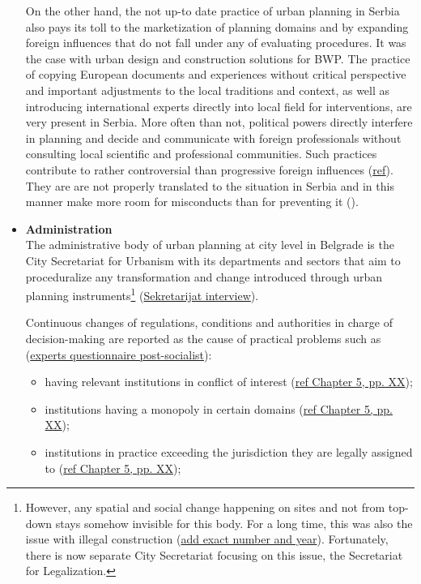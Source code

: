 \documentclass[11pt]{report}
\begin{document}
\begin{itemize}
On the other hand, the not up-to date practice of urban planning in Serbia also pays its toll to the marketization of planning domains and by expanding foreign influences that do not fall under any of evaluating procedures.
It was the case with urban design and construction solutions for BWP.
The practice of copying European documents and experiences without critical perspective and important adjustments to the local traditions and context, as well as introducing international experts directly into local field for interventions, are very present in Serbia.
More often than not, political powers directly interfere in planning and decide and communicate with foreign professionals without consulting local scientific and professional communities.
Such practices contribute to rather controversial than progressive foreign influences (\href{}{ref}). They are are not properly translated to the situation in Serbia and in this manner make more room for misconducts than for preventing it (\cite{Vujosevic 2012}).
\\

\item \textbf{Administration}
\\
The administrative body of urban planning at city level in Belgrade is the City Secretariat for Urbanism with its departments and sectors that aim to proceduralize any transformation and change introduced through urban planning instruments\footnote{However, any spatial and social change happening on sites and not from top-down stays somehow invisible for this body. For a long time, this was also the issue with illegal construction (\href{}{add exact number and year}). Fortunately, there is now separate City Secretariat focusing on this issue, the Secretariat for Legalization.}
(\href{}{Sekretarijat interview}).

Continuous changes of regulations, conditions and authorities in charge of decision-making are reported as the cause of practical problems such as (\href{}{experts questionnaire post-socialist}):

\begin{itemize}
\item having relevant institutions in conflict of interest (\href{}{ref Chapter 5, pp. XX}); 
\item institutions having a monopoly in certain domains (\href{}{ref Chapter 5, pp. XX});
\item institutions in practice exceeding the jurisdiction they are legally assigned to (\href{}{ref Chapter 5, pp. XX});
\end{itemize}


\end{itemize}
\end{document}
